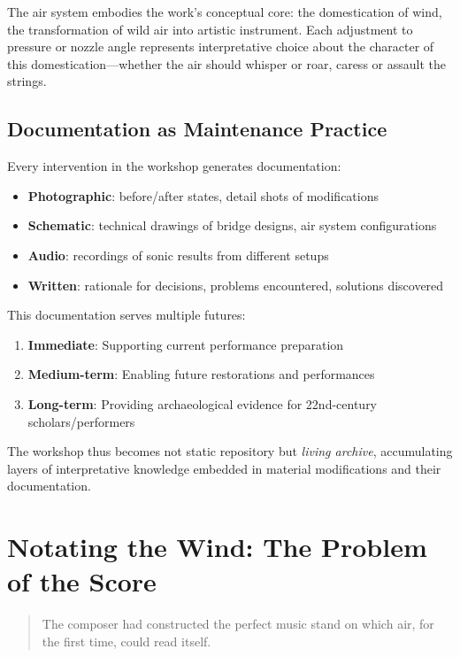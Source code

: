 The air system embodies the work's conceptual core: the domestication of wind, 
the transformation of wild air into artistic instrument. Each adjustment to 
pressure or nozzle angle represents interpretative choice about the character 
of this domestication---whether the air should whisper or roar, caress or 
assault the strings.

\subsection{Documentation as Maintenance Practice}

Every intervention in the workshop generates documentation:
\begin{itemize}
  \item \textbf{Photographic}: before/after states, detail shots of 
  modifications
  \item \textbf{Schematic}: technical drawings of bridge designs, air system 
  configurations
  \item \textbf{Audio}: recordings of sonic results from different setups
  \item \textbf{Written}: rationale for decisions, problems encountered, 
  solutions discovered
\end{itemize}

This documentation serves multiple futures:
\begin{enumerate}
  \item \textbf{Immediate}: Supporting current performance preparation
  \item \textbf{Medium-term}: Enabling future restorations and performances
  \item \textbf{Long-term}: Providing archaeological evidence for 22nd-century 
  scholars/performers
\end{enumerate}

The workshop thus becomes not static repository but \emph{living archive}, 
accumulating layers of interpretative knowledge embedded in material 
modifications and their documentation.

\section{Notating the Wind: The Problem of the Score}

\begin{quote}
  \begin{sf}
    \small
    The composer had constructed the perfect music stand on which air, for the 
    first time, could read itself. \cite{silvi2025lazzaro}
  \end{sf}
\end{quote}

